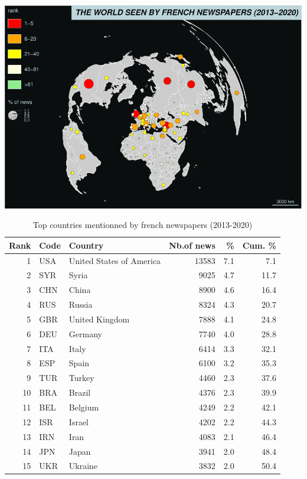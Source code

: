 \documentclass[
]{article}
\begin{document}
\includegraphics{Part2_maps_files/figure-latex/unnamed-chunk-5-1.pdf}

\begin{table}

\caption{\label{tab:unnamed-chunk-6}Top countries mentionned by french newspapers (2013-2020)}
\centering
\begin{tabular}[t]{r|l|l|r|r|r}
\hline
Rank & Code & Country & Nb.of news & \% & Cum. \%\\
\hline
1 & USA & United States of America & 13583 & 7.1 & 7.1\\
\hline
2 & SYR & Syria & 9025 & 4.7 & 11.7\\
\hline
3 & CHN & China & 8900 & 4.6 & 16.4\\
\hline
4 & RUS & Russia & 8324 & 4.3 & 20.7\\
\hline
5 & GBR & United Kingdom & 7888 & 4.1 & 24.8\\
\hline
6 & DEU & Germany & 7740 & 4.0 & 28.8\\
\hline
7 & ITA & Italy & 6414 & 3.3 & 32.1\\
\hline
8 & ESP & Spain & 6100 & 3.2 & 35.3\\
\hline
9 & TUR & Turkey & 4460 & 2.3 & 37.6\\
\hline
10 & BRA & Brazil & 4376 & 2.3 & 39.9\\
\hline
11 & BEL & Belgium & 4249 & 2.2 & 42.1\\
\hline
12 & ISR & Israel & 4202 & 2.2 & 44.3\\
\hline
13 & IRN & Iran & 4083 & 2.1 & 46.4\\
\hline
14 & JPN & Japan & 3941 & 2.0 & 48.4\\
\hline
15 & UKR & Ukraine & 3832 & 2.0 & 50.4\\
\hline
\end{tabular}
\end{table}
\end{document}
